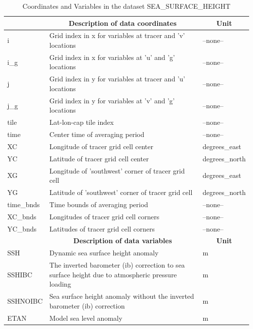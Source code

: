 \begin{longtable}{|m{}|m{}|m{}|}
\caption{Coordinates and Variables in the dataset SEA\_SURFACE\_HEIGHT}
\label{tab:table-SEA_SURFACE_HEIGHT-fields} \\ 
\hline \endhead \hline \endfoot
\rowcolor{lightgray} \multicolumn{1}{|c|}{\textbf{Coordinates}} & \multicolumn{1}{|c|}{\textbf{Description of data coordinates}} &  \multicolumn{1}{|c|}{\textbf{Unit}}\\ \hline
i &Grid index in x for variables at tracer and 'v' locations &--none--  \\ \hline
i\_g &Grid index in x for variables at 'u' and 'g' locations &--none--  \\ \hline
j &Grid index in y for variables at tracer and 'u' locations &--none--  \\ \hline
j\_g &Grid index in y for variables at 'v' and 'g' locations &--none--  \\ \hline
tile &Lat-lon-cap tile index &--none--  \\ \hline
time &Center time of averaging period &--none--  \\ \hline
XC &Longitude of tracer grid cell center &degrees\_east  \\ \hline
YC &Latitude of tracer grid cell center &degrees\_north  \\ \hline
XG &Longitude of 'southwest' corner of tracer grid cell &degrees\_east  \\ \hline
YG &Latitude of 'southwest' corner of tracer grid cell &degrees\_north  \\ \hline
time\_bnds &Time bounds of averaging period &--none--  \\ \hline
XC\_bnds &Longitudes of tracer grid cell corners &--none--  \\ \hline
YC\_bnds &Latitudes of tracer grid cell corners &--none--  \\ \hline
\rowcolor{lightgray} \multicolumn{1}{|c|}{\textbf{Variables}} & \multicolumn{1}{|c|}{\textbf{Description of data variables}} &  \multicolumn{1}{|c|}{\textbf{Unit}}\\ \hline
SSH &Dynamic sea surface height anomaly &m  \\ \hline
SSHIBC &The inverted barometer (ib) correction to sea surface height due to atmospheric pressure loading &m  \\ \hline
SSHNOIBC &Sea surface height anomaly without the inverted barometer (ib) correction &m  \\ \hline
ETAN &Model sea level anomaly &m  \\ \hline
\end{longtable}

